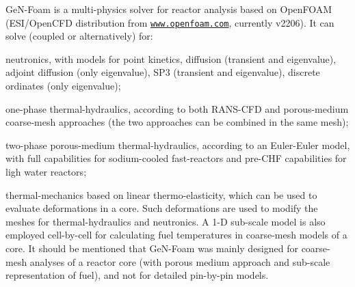 Ge\+N-\/\+Foam is a multi-\/physics solver for reactor analysis based on Open\+F\+O\+AM (E\+S\+I/\+Open\+C\+FD distribution from \href{https://www.openfoam.com}{\tt www.\+openfoam.\+com}, currently v2206). It can solve (coupled or alternatively) for\+:


\begin{DoxyItemize}
\item neutronics, with models for point kinetics, diffusion (transient and eigenvalue), adjoint diffusion (only eigenvalue), S\+P3 (transient and eigenvalue), discrete ordinates (only eigenvalue);
\item one-\/phase thermal-\/hydraulics, according to both R\+A\+N\+S-\/\+C\+FD and porous-\/medium coarse-\/mesh approaches (the two approaches can be combined in the same mesh);
\item two-\/phase porous-\/medium thermal-\/hydraulics, according to an Euler-\/\+Euler model, with full capabilities for sodium-\/cooled fast-\/reactors and pre-\/\+C\+HF capabilities for ligh water reactors;
\item thermal-\/mechanics based on linear thermo-\/elasticity, which can be used to evaluate deformations in a core. Such deformations are used to modify the meshes for thermal-\/hydraulics and neutronics. A 1-\/D sub-\/scale model is also employed cell-\/by-\/cell for calculating fuel temperatures in coarse-\/mesh models of a core. It should be mentioned that Ge\+N-\/\+Foam was mainly designed for coarse-\/mesh analyses of a reactor core (with porous medium approach and sub-\/scale representation of fuel), and not for detailed pin-\/by-\/pin models.
\end{DoxyItemize}

